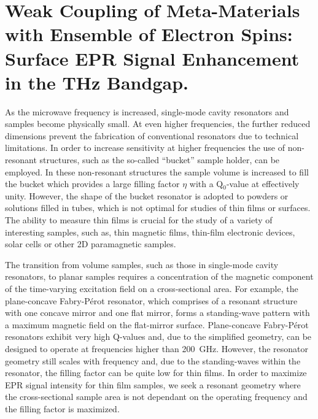 \chapter[Weak Coupling of Meta-Materials with FD-FT THz EPR]{Weak Coupling of Meta-Materials with Ensemble of Electron Spins: Surface EPR Signal Enhancement in the THz Bandgap.}


As the microwave frequency is increased, single-mode cavity resonators and samples become physically small. At even higher frequencies, the further reduced dimensions prevent the fabrication of conventional resonators due to technical limitations. In order to increase sensitivity at higher frequencies the use of non-resonant structures, such as the so-called ``bucket'' sample holder, can be employed. In these non-resonant structures the sample volume is increased to fill the bucket which provides a large filling factor $\eta$ with a Q$_0$-value at effectively unity. \cite{grinbergVHF} However, the shape of the bucket resonator is adopted to powders or solutions filled in tubes, which is not optimal for studies of thin films or surfaces. The ability to measure thin films is crucial for the study of a variety of interesting samples, such as, thin magnetic films, thin-film electronic devices, solar cells or other 2D paramagnetic samples.

The transition from volume samples, such as those in single-mode cavity resonators, to planar samples requires a concentration of the magnetic component of the time-varying excitation field on a cross-sectional area. For example, the plane-concave Fabry-P\'{e}rot resonator, which comprises of a resonant structure with one concave mirror and one flat mirror, forms a standing-wave pattern with a maximum magnetic field on the flat-mirror surface. \cite{grinbergVHF} Plane-concave Fabry-P\'{e}rot resonators exhibit very high Q-values and, due to the simplified geometry, can be designed to operate at frequencies higher than 200~GHz. \cite{Clarke1982Fabry,BraakmanFabry} However, the resonator geometry still scales with frequency and, due to the standing-waves within the resonator, the filling factor can be quite low for thin films. In order to maximize EPR signal intensity for thin film samples, we seek a resonant geometry where the cross-sectional sample area is not dependant on the operating frequency and the filling factor is maximized. 

